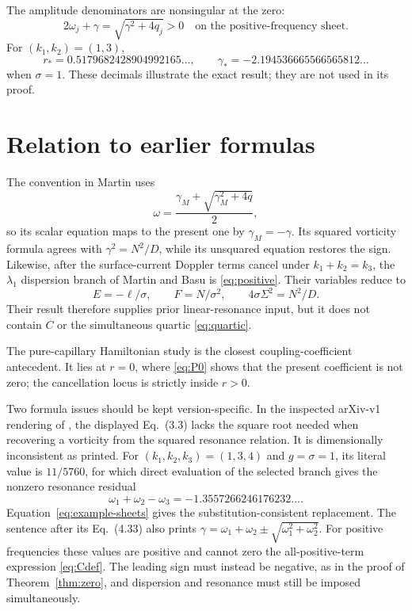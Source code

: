 \documentclass[11pt]{article}
\theoremstyle{remark}
\begin{document}
The amplitude denominators are nonsingular at the zero:
\begin{equation}
 2\omega_j+\gamma=\sqrt{\gamma^2+4q_j}>0
 \quad\text{on the positive-frequency sheet}.   \label{eq:denominators}
\end{equation}
For \((k_1,k_2)=(1,3)\),
\[
 r_*=0.5179682428904992165\ldots,\qquad
 \gamma_*=-2.194536665566565812\ldots
\]
when \(\sigma=1\). These decimals illustrate the exact result; they are not
used in its proof.

\section{Relation to earlier formulas}

The convention in Martin \cite{Martin2017} uses
\[
 \omega=\frac{\gamma_M+\sqrt{\gamma_M^2+4q}}{2},
\]
so its scalar equation maps to the present one by
\(\gamma_M=-\gamma\). Its squared vorticity formula agrees with
\(\gamma^2=N^2/D\), while its unsquared equation restores the sign.
Likewise, after the surface-current Doppler terms cancel under
\(k_1+k_2=k_3\), the \(\lambda_1\) dispersion branch of Martin and Basu
\cite{MartinBasu2021} is \eqref{eq:positive}. Their variables reduce to
\[
 E=-\ell/\sigma,\qquad F=N/\sigma^2,\qquad
 4\sigma\Sigma^2=N^2/D.
\]
Their result therefore supplies prior linear-resonance input, but it does not
contain \(C\) or the simultaneous quartic \eqref{eq:quartic}.

The pure-capillary Hamiltonian study
\cite{ConstantinKartashovaWahlen2010} is the closest coupling-coefficient
antecedent. It lies at \(r=0\), where \eqref{eq:P0} shows that the present
coefficient is not zero; the cancellation locus is strictly inside
\(r>0\).

Two formula issues should be kept version-specific. In the inspected
arXiv-v1 rendering of \cite{IvanovMartin2019}, the displayed Eq.~(3.3) lacks
the square root needed when recovering a vorticity from the squared
resonance relation. It is dimensionally inconsistent as printed. For
\((k_1,k_2,k_3)=(1,3,4)\) and \(g=\sigma=1\), its literal value is
\(11/5760\), for which direct evaluation of the selected branch gives the
nonzero resonance residual
\[
 \omega_1+\omega_2-\omega_3=-1.3557266246176232\ldots.
\]
Equation~\eqref{eq:example-sheets} gives the substitution-consistent
replacement. The sentence after its Eq.~(4.33) also prints
\(\gamma=\omega_1+\omega_2\pm\sqrt{\omega_1^2+\omega_2^2}\). For positive
frequencies these values are positive and cannot zero the all-positive-term
expression \eqref{eq:Cdef}. The leading sign must instead be negative, as
in the proof of Theorem~\ref{thm:zero}, and dispersion and resonance must
still be imposed simultaneously.
\end{document}

